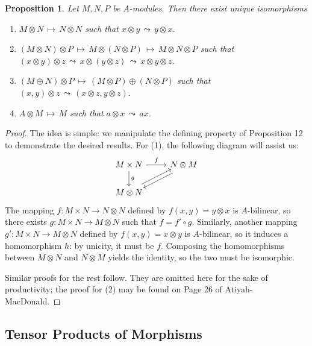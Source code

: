\documentclass[11pt]{article}
\newtheorem{proposition}{Proposition}
\begin{document}
\begin{adjustwidth}{0.5cm}{}
  \begin{proposition}
    Let $M, N, P$ be $A$-modules. Then there exist unique isomorphisms
    \begin{enumerate}
      \item $M \otimes N \, \mapsto \, N \otimes N$ such that $x \otimes y \, \leadsto \, y \otimes x$.
      \item $(M \otimes N) \otimes P \, \mapsto \, M \otimes (N \otimes P) \, \mapsto \, M \otimes N \otimes P$ such that $(x \otimes y) \otimes z \, \leadsto \, x \otimes (y \otimes z) \, \leadsto \, x \otimes y \otimes z$.
      \item $(M \oplus N) \otimes P \, \mapsto \, (M \otimes P) \oplus (N \otimes P)$ such that $(x, y) \otimes z \, \leadsto \, (x \otimes z, y \otimes z)$.
      \item $A \otimes M \, \mapsto \, M$ such that $a \otimes x \, \leadsto \, ax$.
    \end{enumerate}
  \end{proposition}
  \begin{proof}
    The idea is simple: we manipulate the defining property of Proposition 12 to demonstrate the desired results. For (1), the following diagram will assist us:
    \[
      \begin{tikzcd}
       M \times N \arrow[d, "g"] \arrow[r, "f"] & N \otimes M \arrow[ld, shift left] \\
      M \otimes N \arrow[ru, shift left]        &                                   
      \end{tikzcd}
    \]
    The mapping $f : M \times N \to N \otimes N$ defined by $f(x, y) = y \otimes x$ is $A$-bilinear, so there exists $g : M \times N \to M \otimes N$ such that $f = f' \circ g$. Similarly, another mapping $g' : M \times N \to M \otimes N$ defined by $f(x, y) = x \otimes y$ is $A$-bilinear, so it induces a homomorphism $h$: by unicity, it must be $f$. Composing the homomorphisms between $M \otimes N$ and $N \otimes M$ yields the identity, so the two must be isomorphic.

    Similar proofs for the rest follow. They are omitted here for the sake of productivity; the proof for (2) may be found on Page 26 of Atiyah-MacDonald.
  \end{proof}
\end{adjustwidth}


\subsection{Tensor Products of Morphisms}
\end{document}

